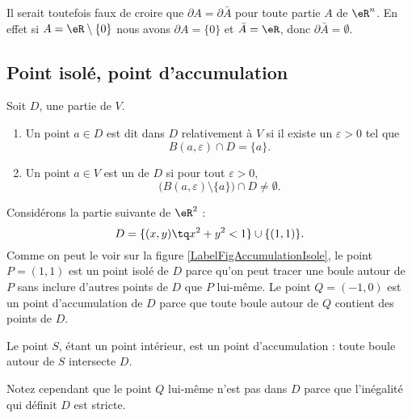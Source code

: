 \begin{remark}
    Il serait toutefois faux de croire que \( \partial A=\partial \bar A\) pour toute partie \( A\) de \( \eR^n\). En effet si \( A=\eR\setminus\{ 0 \}\) nous avons \( \partial A=\{ 0 \}\) et \( \bar A=\eR\), donc \( \partial \bar A=\emptyset\).
\end{remark}

\subsection{Point isolé, point d'accumulation}

\begin{definition}
	Soit $D$, une partie de $V$.
	\begin{enumerate}
		\item
			Un point $a\in D$ est dit  dans $D$ relativement à $V$ si il existe un $\varepsilon>0$ tel que
			\begin{equation}
				B(a,\varepsilon)\cap D=\{ a \}.
			\end{equation}
		\item
			Un point $a\in V$ est un  de $D$ si pour tout $\varepsilon>0$,
			\begin{equation}
				\Big( B(a,\varepsilon)\setminus\{ a \}\Big)\cap D\neq \emptyset.
			\end{equation}
	\end{enumerate}
\end{definition}

\newcommand{\CaptionFigAccumulationIsole}{L'ensemble décrit par l'équation \eqref{Eq2807BouleIso}. Le point $P$ est un point isolé de $D$, tandis que  les points $S$ et $Q$ sont des points d'accumulation.}


\begin{example}
	Considérons la partie suivante de $\eR^2$ :
	\begin{equation}	\label{Eq2807BouleIso}
		D=\{ (x,y)\tq x^2+y^2<1\}\cup\{ (1,1) \}.
	\end{equation}
	Comme on peut le voir sur la figure \ref{LabelFigAccumulationIsole}, le point $P=(1,1)$ est un point isolé de $D$ parce qu'on peut tracer une boule autour de $P$ sans inclure d'autres points de $D$ que $P$ lui-même. Le point $Q=(-1,0)$ est un point d'accumulation de $D$ parce que toute boule autour de $Q$ contient des points de $D$.

    Le point $S$, étant un point intérieur, est un point d'accumulation : toute boule autour de $S$ intersecte $D$.
    
    Notez cependant que le point $Q$ lui-même n'est pas dans $D$ parce que l'inégalité qui définit $D$ est stricte.
\end{example}

